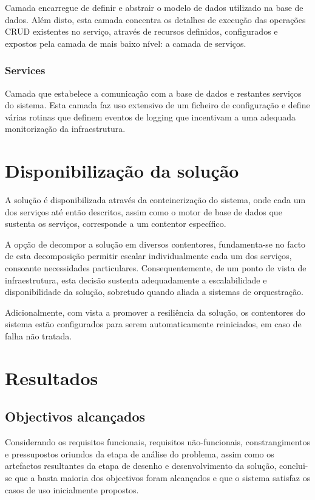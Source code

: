 Camada encarregue de definir e abstrair o modelo de dados utilizado na base de dados. Além disto, esta camada concentra os detalhes de execução das operações CRUD existentes no serviço, através de recursos definidos, configurados e expostos pela camada de mais baixo nível: a camada de serviços.

\subsubsection{Services}

Camada que estabelece a comunicação com a base de dados e restantes serviços do sistema. Esta camada faz uso extensivo de um ficheiro de configuração e define várias rotinas que definem eventos de logging que incentivam a uma adequada monitorização da infraestrutura.

\section{Disponibilização da solução}

A solução é disponibilizada através da conteinerização do sistema, onde cada um dos serviços até então descritos, assim como o motor de base de dados que sustenta os serviços, corresponde a um contentor específico.

A opção de decompor a solução em diversos contentores, fundamenta-se no facto de esta decomposição permitir escalar individualmente cada um dos serviços, consoante necessidades particulares. Consequentemente, de um ponto de vista de infraestrutura, esta decisão sustenta adequadamente a escalabilidade e disponibilidade da solução, sobretudo quando aliada a sistemas de orquestração.

Adicionalmente, com vista a promover a resiliência da solução, os contentores do sistema estão configurados para serem automaticamente reiniciados, em caso de falha não tratada.

\section{Resultados}

\subsection{Objectivos alcançados}

Considerando os requisitos funcionais, requisitos não-funcionais, constrangimentos e pressupostos oriundos da etapa de análise do problema, assim como os artefactos resultantes da etapa de desenho e desenvolvimento da solução, conclui-se que a basta maioria dos objectivos foram alcançados e que o sistema satisfaz os casos de uso inicialmente propostos.


